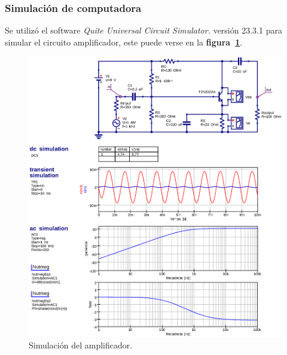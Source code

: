 \subsubsection{Simulación de computadora}
Se utilizó el software \emph{Quite Universal Circuit Simulator.} versión 23.3.1
para simular el circuito amplificador, este puede verse en la
\textbf{figura~\ref{figura23}}.

\begin{figure}[!h]
\centering
\includegraphics[scale=0.72]{diagramas/figura23.eps}
\caption{Simulación del amplificador.}
\label{figura23}
\end{figure}

